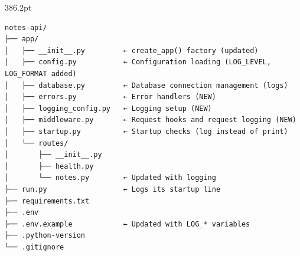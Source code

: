 \begin{codebox}

\begin{Shaded}
\begin{Highlighting}[]

\OperatorTok{=}

\OperatorTok{=}

\OperatorTok{=}
\OperatorTok{=}
\OperatorTok{=}

\OperatorTok{=}
\OperatorTok{=}
\OperatorTok{=}
\end{Highlighting}
\end{Shaded}

\end{codebox}

\label{16-logging-error-handling:the-updated-project-structure}

\begin{diagrambox}[short]{386.2pt}
\begin{Verbatim}[fontsize=\fontsize{9.0}{8.55}\selectfont]
notes-api/
├── app/
│   ├── __init__.py         ← create_app() factory (updated)
│   ├── config.py           ← Configuration loading (LOG_LEVEL, LOG_FORMAT added)
│   ├── database.py         ← Database connection management (logs)
│   ├── errors.py           ← Error handlers (NEW)
│   ├── logging_config.py   ← Logging setup (NEW)
│   ├── middleware.py       ← Request hooks and request logging (NEW)
│   ├── startup.py          ← Startup checks (log instead of print)
│   └── routes/
│       ├── __init__.py
│       ├── health.py
│       └── notes.py        ← Updated with logging
├── run.py                  ← Logs its startup line
├── requirements.txt
├── .env
├── .env.example            ← Updated with LOG_* variables
├── .python-version
└── .gitignore
\end{Verbatim}
\end{diagrambox}

